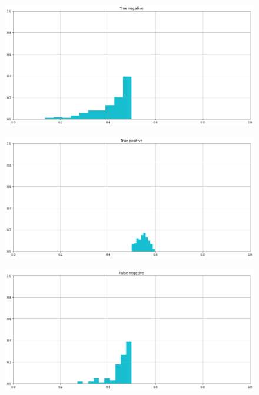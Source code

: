 \documentclass[12pt]{report}
\theoremstyle{definition}
\begin{document}
\begin{figure}
\centering
    \begin{minipage}{0.48\textwidth}
     \includegraphics[width=\linewidth]{images/experiment_beta5_sovrapposti/tn.png}\label{tn_b5s}
   \end{minipage}
   \begin{minipage}{0.48\textwidth}
     \includegraphics[width=\linewidth]{images/experiment_beta5_sovrapposti/tp.png}\label{tp_b5s}
   \end{minipage}
   \begin{minipage}{0.48\textwidth}
     \includegraphics[width=\linewidth]{images/experiment_beta5_sovrapposti/fn.png}\label{fn_b5s}
   \end{minipage}

\end{figure}
\end{document}
